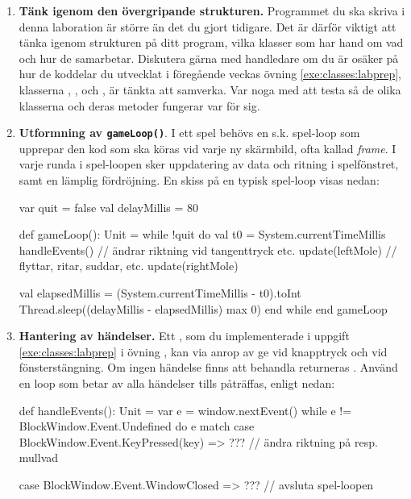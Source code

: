 \begin{enumerate}[leftmargin=*]
\item \textbf{Tänk igenom den övergripande strukturen.} Programmet du ska skriva i denna laboration är större än det du gjort tidigare. Det är därför viktigt att tänka igenom strukturen på ditt program, vilka klasser som har hand om vad och hur de samarbetar. Diskutera gärna med handledare om du är osäker på hur de koddelar du utvecklat i föregående veckas övning \ref{exe:classes:labprep}, klasserna , ,  och , är tänkta att samverka. Var noga med att testa så de olika klasserna och deras metoder fungerar var för sig.     

\item \textbf{Utformning av \texttt{gameLoop()}}. I ett spel behövs en s.k. spel-loop  som upprepar den kod som ska köras vid varje ny skärmbild, ofta kallad \emph{frame}. I varje runda i spel-loopen sker uppdatering av data och ritning i spelfönstret, samt en lämplig fördröjning. En skiss på en typisk spel-loop visas nedan:
\begin{CodeSmall}
  var quit = false
  val delayMillis = 80

  def gameLoop(): Unit = 
    while !quit do
      val t0 = System.currentTimeMillis
      handleEvents()    // ändrar riktning vid tangenttryck etc.
      update(leftMole)  // flyttar, ritar, suddar, etc.
      update(rightMole)

      val elapsedMillis = (System.currentTimeMillis - t0).toInt
      Thread.sleep((delayMillis - elapsedMillis) max 0)
    end while
  end gameLoop
\end{CodeSmall}

\item \textbf{Hantering av händelser.} Ett , som du implementerade i uppgift \ref{exe:classes:labprep} i övning \texttt{\ExeWeekFIVE}, kan via anrop av  ge    vid knapptryck och  vid fönsterstängning. Om ingen händelse finns att behandla returneras . Använd en loop som betar av alla händelser tills  påträffas, enligt nedan:

\begin{CodeSmall}
  def handleEvents(): Unit = 
    var e = window.nextEvent()
    while e != BlockWindow.Event.Undefined do
      e match 
        case BlockWindow.Event.KeyPressed(key) =>
          ???  // ändra riktning på resp. mullvad

        case BlockWindow.Event.WindowClosed =>
          ???  // avsluta spel-loopen
      

\end{CodeSmall}
\end{enumerate}
